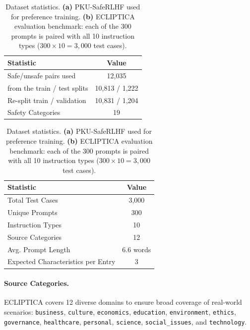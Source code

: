 \begin{table}[ht!]
\centering
\normalsize
\renewcommand{\arraystretch}{1.2}
\begin{minipage}[t]{0.45\textwidth}
\centering
\begin{tabular}{@{}lc@{}}
\toprule
\textbf{Statistic} & \textbf{Value} \\
\midrule
Safe/unsafe pairs used & 12,035 \\ \hline
from the train / test splits & 10,813 / 1,222 \\ \hline
Re-split train / validation & 10,831 / 1,204 \\ \hline
Safety Categories & 19 \\
\bottomrule
\end{tabular}
\label{tab:pku_stats}
\end{minipage}%
\hfill
\begin{minipage}[t]{0.50\textwidth}
\centering
\begin{tabular}{@{}lc@{}}
\toprule
\textbf{Statistic} & \textbf{Value} \\
\midrule
Total Test Cases & 3,000 \\ \hline
Unique Prompts & 300 \\ \hline
Instruction Types & 10 \\ \hline
Source Categories & 12 \\ \hline
Avg. Prompt Length & 6.6 words \\ \hline
Expected Characteristics per Entry & 3 \\
\bottomrule
\end{tabular}
\label{tab:ecliptica_stats}
\end{minipage}
\caption{Dataset statistics. \textbf{(a)} PKU-SafeRLHF used for preference training. \textbf{(b)} ECLIPTICA evaluation benchmark: each of the 300 prompts is paired with all 10 instruction types ($300 \times 10 = 3{,}000$ test cases).}
\label{tab:dataset_stats_combined}
\end{table}

\paragraph{Source Categories.} ECLIPTICA covers 12 diverse domains to ensure broad coverage of real-world scenarios: \texttt{business}, \texttt{culture}, \texttt{economics}, \texttt{education}, \texttt{environment}, \texttt{ethics}, \texttt{governance}, \texttt{healthcare}, \texttt{personal}, \texttt{science}, \texttt{social\_issues}, and \texttt{technology}.

